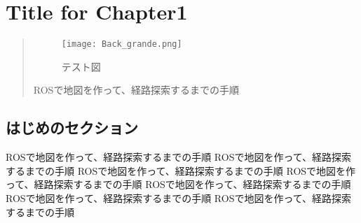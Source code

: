 \chapter{Title for Chapter1}%

\begin{abstract}

\begin{figure}[htbp]
 \begin{center}
 \texttt{[image: Back\_grande.png]}
 \end{center}
 \caption{テスト図}
\end{figure}

ROSで地図を作って、経路探索するまでの手順
\end{abstract}

\section{はじめのセクション}

ROSで地図を作って、経路探索するまでの手順
ROSで地図を作って、経路探索するまでの手順
ROSで地図を作って、経路探索するまでの手順
ROSで地図を作って、経路探索するまでの手順
ROSで地図を作って、経路探索するまでの手順
ROSで地図を作って、経路探索するまでの手順
ROSで地図を作って、経路探索するまでの手順


%


